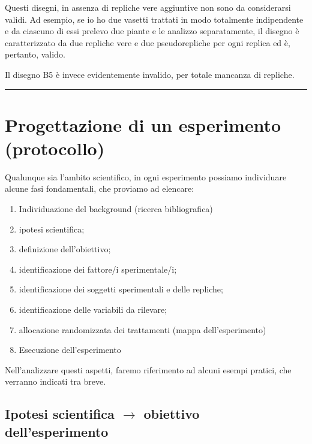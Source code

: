 \documentclass[a4paper,12pt,oneside]{book}
\providecommand{\tightlist}{%
  \setlength{\itemsep}{0pt}\setlength{\parskip}{0pt}}
\begin{document}
Questi disegni, in assenza di repliche vere aggiuntive non sono da
considerarsi validi. Ad esempio, se io ho due vasetti trattati in modo
totalmente indipendente e da ciascuno di essi prelevo due piante e le
analizzo separatamente, il disegno è caratterizzato da due repliche vere
e due pseudorepliche per ogni replica ed è, pertanto, valido.

Il disegno B5 è invece evidentemente invalido, per totale mancanza di
repliche.

\begin{center}\rule{0.5\linewidth}{\linethickness}\end{center}

\section{Progettazione di un esperimento
(protocollo)}\label{progettazione-di-un-esperimento-protocollo}

Qualunque sia l'ambito scientifico, in ogni esperimento possiamo
individuare alcune fasi fondamentali, che proviamo ad elencare:

\begin{enumerate}
\def\labelenumi{\arabic{enumi}.}
\tightlist
\item
  Individuazione del background (ricerca bibliografica)
\item
  ipotesi scientifica;
\item
  definizione dell'obiettivo;
\item
  identificazione dei fattore/i sperimentale/i;
\item
  identificazione dei soggetti sperimentali e delle repliche;
\item
  identificazione delle variabili da rilevare;
\item
  allocazione randomizzata dei trattamenti (mappa dell'esperimento)
\item
  Esecuzione dell'esperimento
\end{enumerate}

Nell'analizzare questi aspetti, faremo riferimento ad alcuni esempi
pratici, che verranno indicati tra breve.

\subsection{\texorpdfstring{Ipotesi scientifica \(\rightarrow\)
obiettivo
dell'esperimento}{Ipotesi scientifica \textbackslash{}rightarrow obiettivo dell'esperimento}}\label{ipotesi-scientifica-rightarrow-obiettivo-dellesperimento}
\end{document}
